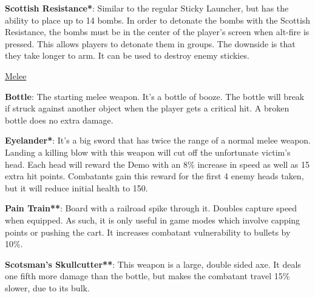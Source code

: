 {\bf Scottish Resistance*}: Similar to the regular Sticky Launcher, but has the ability to place up to 14 bombs. In order to detonate the bombs with the Scottish Resistance, the bombs must be in the center of the player's screen when alt-fire is pressed. This allows players to detonate them in groups. The downside is that they take longer to arm. It can be used to destroy enemy stickies.

\newpage

\begin {center}
\underline {Melee}
\end {center}

{\bf Bottle}: The starting melee weapon. It's a bottle of booze. The bottle will break if struck against another object when the player gets a critical hit. A broken bottle does no extra damage.

{\bf Eyelander*}: It's a big sword that has twice the range of a normal melee weapon. Landing a killing blow with this weapon will cut off the unfortunate victim's head. Each head will reward the Demo with an 8\% increase in speed as well as 15 extra hit points. Combatants gain this reward for the first 4 enemy heads taken, but it will reduce initial health to 150.

{\bf Pain Train**}: Board with a railroad spike through it. Doubles capture speed when equipped. As such, it is only useful in game modes which involve capping points or pushing the cart. It increases combatant vulnerability to bullets by 10\%.

{\bf Scotsman's Skullcutter**}: This weapon is a large, double sided axe.  It deals one fifth more damage than the bottle, but makes the combatant travel 15\% slower, due to its bulk.


